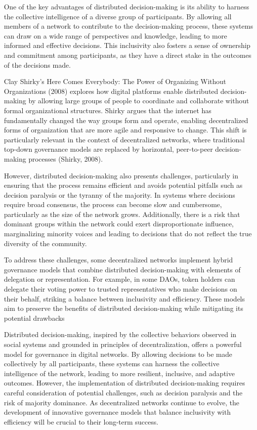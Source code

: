 \documentclass[12pt,twoside]{article}
\begin{document}
One of the key advantages of distributed decision-making is its ability to harness the collective intelligence of a diverse group of participants. By allowing all members of a network to contribute to the decision-making process, these systems can draw on a wide range of perspectives and knowledge, leading to more informed and effective decisions. This inclusivity also fosters a sense of ownership and commitment among participants, as they have a direct stake in the outcomes of the decisions made.

Clay Shirky's Here Comes Everybody: The Power of Organizing Without Organizations (2008) explores how digital platforms enable distributed decision-making by allowing large groups of people to coordinate and collaborate without formal organizational structures. Shirky argues that the internet has fundamentally changed the way groups form and operate, enabling decentralized forms of organization that are more agile and responsive to change. This shift is particularly relevant in the context of decentralized networks, where traditional top-down governance models are replaced by horizontal, peer-to-peer decision-making processes (Shirky, 2008).

However, distributed decision-making also presents challenges, particularly in ensuring that the process remains efficient and avoids potential pitfalls such as decision paralysis or the tyranny of the majority. In systems where decisions require broad consensus, the process can become slow and cumbersome, particularly as the size of the network grows. Additionally, there is a risk that dominant groups within the network could exert disproportionate influence, marginalizing minority voices and leading to decisions that do not reflect the true diversity of the community.

To address these challenges, some decentralized networks implement hybrid governance models that combine distributed decision-making with elements of delegation or representation. For example, in some DAOs, token holders can delegate their voting power to trusted representatives who make decisions on their behalf, striking a balance between inclusivity and efficiency. These models aim to preserve the benefits of distributed decision-making while mitigating its potential drawbacks

Distributed decision-making, inspired by the collective behaviors observed in social systems and grounded in principles of decentralization, offers a powerful model for governance in digital networks. By allowing decisions to be made collectively by all participants, these systems can harness the collective intelligence of the network, leading to more resilient, inclusive, and adaptive outcomes. However, the implementation of distributed decision-making requires careful consideration of potential challenges, such as decision paralysis and the risk of majority dominance. As decentralized networks continue to evolve, the development of innovative governance models that balance inclusivity with efficiency will be crucial to their long-term success.
\end{document}
